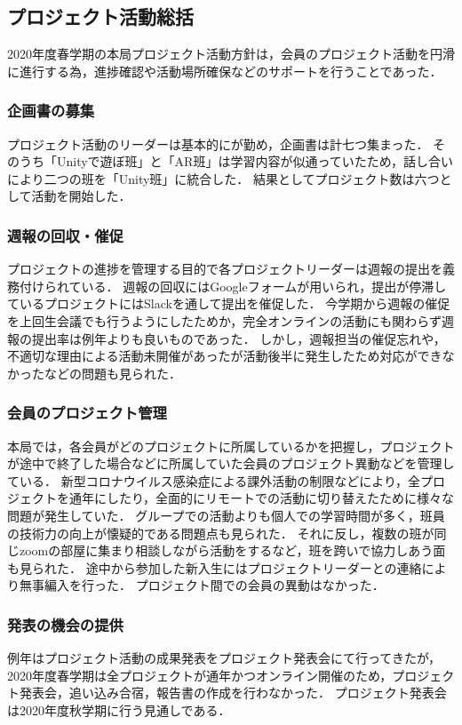 \subsection*{プロジェクト活動総括}


2020年度春学期の本局プロジェクト活動方針は，会員のプロジェクト活動を円滑に進行する為，進捗確認や活動場所確保などのサポートを行うことであった．

\subsubsection*{企画書の募集}

プロジェクト活動のリーダーは基本的に\secondGrade{}が勤め，企画書は計七つ集まった．
そのうち「Unityで遊ぼ班」と「AR班」は学習内容が似通っていたため，話し合いにより二つの班を「Unity班」に統合した．
結果としてプロジェクト数は六つとして活動を開始した．

\subsubsection*{週報の回収・催促}

プロジェクトの進捗を管理する目的で各プロジェクトリーダーは週報の提出を義務付けられている．
週報の回収にはGoogleフォームが用いられ，提出が停滞しているプロジェクトにはSlackを通して提出を催促した．
今学期から週報の催促を上回生会議でも行うようにしたためか，完全オンラインの活動にも関わらず週報の提出率は例年よりも良いものであった．
しかし，週報担当の催促忘れや，不適切な理由による活動未開催があったが活動後半に発生したため対応ができなかったなどの問題も見られた．

\subsubsection*{会員のプロジェクト管理}

本局では，各会員がどのプロジェクトに所属しているかを把握し，プロジェクトが途中で終了した場合などに所属していた会員のプロジェクト異動などを管理している．
新型コロナウイルス感染症による課外活動の制限などにより，全プロジェクトを通年にしたり，全面的にリモートでの活動に切り替えたために様々な問題が発生していた．
グループでの活動よりも個人での学習時間が多く，班員の技術力の向上が懐疑的である問題点も見られた．
それに反し，複数の班が同じzoomの部屋に集まり相談しながら活動をするなど，班を跨いで協力しあう面も見られた．
途中から参加した新入生にはプロジェクトリーダーとの連絡により無事編入を行った．
プロジェクト間での会員の異動はなかった．

\subsubsection*{発表の機会の提供}

例年はプロジェクト活動の成果発表をプロジェクト発表会にて行ってきたが，2020年度春学期は全プロジェクトが通年かつオンライン開催のため，プロジェクト発表会，追い込み合宿，報告書の作成を行わなかった．
プロジェクト発表会は2020年度秋学期に行う見通しである．
